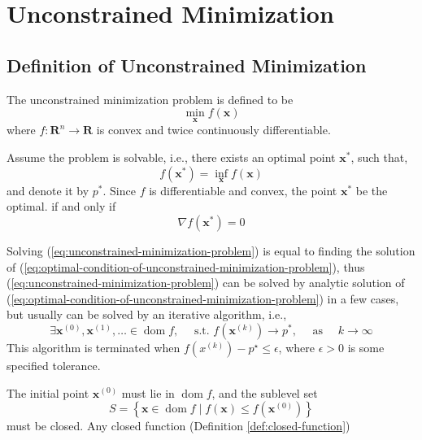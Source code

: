 \chapter{Unconstrained Minimization}

\section{Definition of Unconstrained Minimization}

\begin{definition}
    The unconstrained minimization problem is defined to be
    \begin{equation}
        \min_{\mathbf{x}}f(\mathbf{x})
        \label{eq:unconstrained-minimization-problem}
    \end{equation}
    where $f:\mathbf{R}^n\rightarrow\mathbf{R}$ is convex and twice continuously differentiable.
\end{definition}

Assume the problem is solvable, i.e., there exists an optimal point $\mathbf{x}^{*}$, such that,
\begin{equation*}
    f(\mathbf{x}^{*})=\inf_{\mathbf{x}}f(\mathbf{x})
\end{equation*}
and denote it by $p^{*}$. Since $f$ is differentiable and convex, the point $\mathbf{x}^{*}$ be the optimal. if and only if
\begin{equation}
    \nabla f(\mathbf{x}^{*})=0
    \label{eq:optimal-condition-of-unconstrained-minimization-problem}
\end{equation}

Solving (\ref{eq:unconstrained-minimization-problem}) is equal to finding the solution of (\ref{eq:optimal-condition-of-unconstrained-minimization-problem}), thus (\ref{eq:unconstrained-minimization-problem}) can be solved by analytic solution of (\ref{eq:optimal-condition-of-unconstrained-minimization-problem}) in a few cases, but usually can be solved by an iterative algorithm, i.e.,
\begin{equation*}
    \exists\mathbf{x}^{(0)},\mathbf{x}^{(1)},\ldots\in\operatorname{dom}f,\quad\text{ s.t. }f(\mathbf{x}^{(k)})\rightarrow p^{*},\quad\text{ as }\quad k\rightarrow\infty
\end{equation*}
This algorithm is terminated when $f\left(x^{(k)}\right)-p^{\star}\leq\epsilon$, where $\epsilon>0$ is some specified tolerance.

\begin{remark}
    The initial point $\mathbf{x}^{(0)}$ must lie in $\operatorname{dom}f$, and the sublevel set
    \begin{equation*}
        S=\left\{\mathbf{x}\in\operatorname{dom}f\mid f(\mathbf{x})\leq f(\mathbf{x}^{(0)})\right\}
    \end{equation*}
    must be closed. Any closed function (Definition \ref{def:closed-function})
\end{remark}

